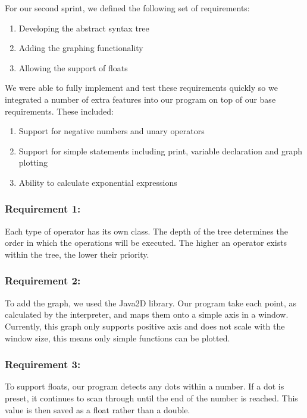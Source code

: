 \documentclass[a4paper, oneside, 11pt]{report}
\begin{document}
For our second sprint, we defined the following set of requirements:

\begin{enumerate}
\item Developing the abstract syntax tree
\item Adding the graphing functionality
\item Allowing the support of floats
\end{enumerate}

We were able to fully implement and test these requirements quickly so we integrated
a number of extra features into our program on top of our base requirements. These
included:
\begin{enumerate}
\item Support for negative numbers and unary operators
\item Support for simple statements including print, variable declaration and graph plotting
\item  Ability to calculate exponential expressions
\end{enumerate}

\subsubsection{Requirement 1:}

Each type of operator has its own class. The depth of the tree determines the order in which the operations will be executed. The higher an operator exists within the tree, the lower their priority.

\subsubsection {Requirement 2:}

To add the graph, we used the Java2D library. Our program take each point, as calculated by the interpreter, and maps them onto a simple axis in a window. Currently, this graph only supports positive axis and does not scale with the window size, this means only simple functions can be plotted.

\subsubsection {Requirement 3:}

To support floats, our program detects any dots within a number. If a dot is preset, it continues to scan through until the end of the number is reached. This value is then saved as a float rather than a double.
\end{document}
